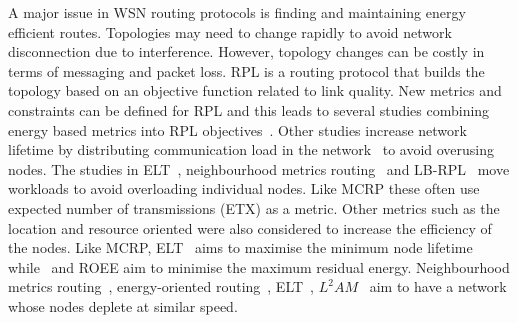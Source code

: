 A major issue in WSN routing protocols is finding and maintaining energy efficient routes.  Topologies may need to change rapidly to avoid network disconnection due to interference.  However, topology changes can be costly in terms of messaging and packet loss.  RPL is a routing protocol that builds the topology based on an objective function related to link quality.  New metrics and constraints can be defined for RPL and this leads to several studies combining energy based metrics into RPL objectives~\cite{energyrpl,energyLHC,elt,customOF,roee,compositeMetric,caof}.  Other studies increase network lifetime by distributing communication load in the network~\cite{loadbalance,spreadload} to avoid overusing nodes.  The studies in ELT~\cite{elt}, neighbourhood metrics routing~\cite{spreadload} and LB-RPL~\cite{loadbalance} move workloads to avoid overloading individual nodes.  Like MCRP these often use expected number of transmissions (ETX) as a metric. Other metrics such as the location and resource oriented were also considered to increase the efficiency of the nodes.
Like MCRP,  ELT~\cite{elt} aims to maximise the minimum node lifetime while~\cite{energyrpl} and ROEE \cite{roee} aim to minimise the maximum residual energy. Neighbourhood metrics routing~\cite{spreadload}, energy-oriented routing~\cite{loadbalance}, ELT~\cite{elt}, $L^{2}AM$~\cite{compositeMetric,customOF} aim to have a network whose nodes deplete at similar speed.  
 
